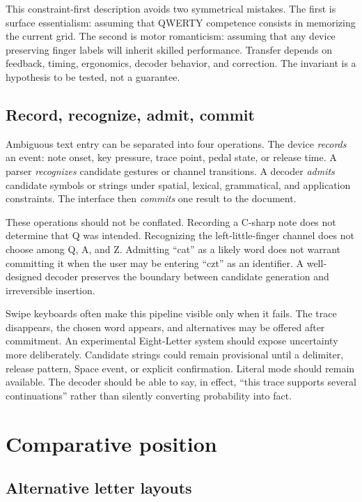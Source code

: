 \documentclass[11pt]{article}
\begin{document}
This constraint-first description avoids two symmetrical mistakes. The first is surface essentialism: assuming that QWERTY competence consists in memorizing the current grid. The second is motor romanticism: assuming that any device preserving finger labels will inherit skilled performance. Transfer depends on feedback, timing, ergonomics, decoder behavior, and correction. The invariant is a hypothesis to be tested, not a guarantee.

\subsection{Record, recognize, admit, commit}

Ambiguous text entry can be separated into four operations. The device \emph{records} an event: note onset, key pressure, trace point, pedal state, or release time. A parser \emph{recognizes} candidate gestures or channel transitions. A decoder \emph{admits} candidate symbols or strings under spatial, lexical, grammatical, and application constraints. The interface then \emph{commits} one result to the document.

These operations should not be conflated. Recording a C-sharp note does not determine that Q was intended. Recognizing the left-little-finger channel does not choose among Q, A, and Z. Admitting ``cat'' as a likely word does not warrant committing it when the user may be entering ``czt'' as an identifier. A well-designed decoder preserves the boundary between candidate generation and irreversible insertion.

Swipe keyboards often make this pipeline visible only when it fails. The trace disappears, the chosen word appears, and alternatives may be offered after commitment. An experimental Eight-Letter system should expose uncertainty more deliberately. Candidate strings could remain provisional until a delimiter, release pattern, Space event, or explicit confirmation. Literal mode should remain available. The decoder should be able to say, in effect, ``this trace supports several continuations'' rather than silently converting probability into fact.

\section{Comparative position}

\subsection{Alternative letter layouts}
\end{document}
